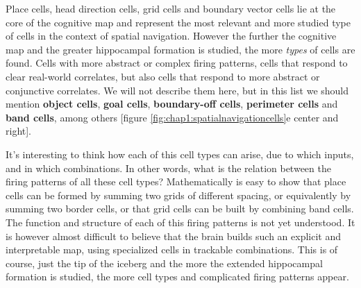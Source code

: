 Place cells, head direction cells, grid cells and boundary vector cells lie at the core of the cognitive map and represent the most relevant and more studied type of cells in the context of spatial navigation. 
However the further the cognitive map and the greater hippocampal formation is studied, the more \textit{types} of cells are found. 
Cells with more abstract or complex firing patterns, cells that respond to clear real-world correlates, but also cells that respond to more abstract or conjunctive correlates. 
We will not describe them here, but in this list we should mention \textbf{object cells}, \textbf{goal cells}, \textbf{boundary-off cells}, \textbf{perimeter cells} and \textbf{band cells}, among others [figure \ref{fig:chap1:spatialnavigationcells}e center and right]. 

It's interesting to think how each of this cell types can arise, due to which inputs, and in which combinations.
In other words, what is the relation between the firing patterns of all these cell types?
Mathematically is easy to show that place cells can be formed by summing two grids of different spacing, or equivalently by summing two border cells, or that grid cells can be built by combining band cells.
The function and structure of each of this firing patterns is not yet understood.
It is however almost difficult to believe that the brain builds such an explicit and interpretable map, using specialized cells in trackable combinations.
This is of course, just the tip of the iceberg and the more the extended hippocampal formation is studied, the more cell types and complicated firing patterns appear. 
